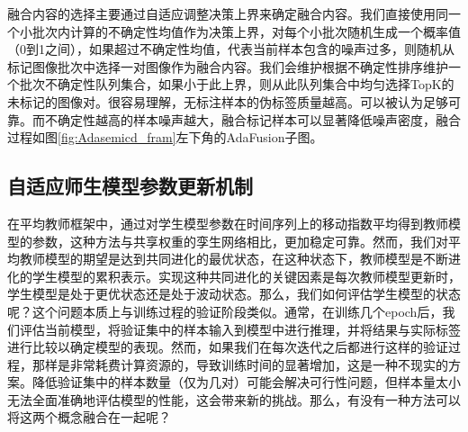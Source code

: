 \documentclass[lang=chs, degree=master, blindreview=false, adobe=false]{yanputhesis}
\begin{document}
融合内容的选择主要通过自适应调整决策上界来确定融合内容。我们直接使用同一个小批次内计算的不确定性均值作为决策上界，对每个小批次随机生成一个概率值（0到1之间），如果超过不确定性均值，代表当前样本包含的噪声过多，则随机从标记图像批次中选择一对图像作为融合内容。我们会维护根据不确定性排序维护一个批次不确定性队列集合，如果小于此上界，则从此队列集合中均匀选择TopK的未标记的图像对。很容易理解，无标注样本的伪标签质量越高。可以被认为足够可靠。而不确定性越高的样本噪声越大，融合标记样本可以显著降低噪声密度，融合过程如图\ref{fig:Adasemicd_fram}左下角的AdaFusion子图。
\subsection{自适应师生模型参数更新机制}
在平均教师框架中，通过对学生模型参数在时间序列上的移动指数平均得到教师模型的参数，这种方法与共享权重的孪生网络相比，更加稳定可靠。然而，我们对平均教师模型的期望是达到共同进化的最优状态，在这种状态下，教师模型是不断进化的学生模型的累积表示。实现这种共同进化的关键因素是每次教师模型更新时，学生模型是处于更优状态还是处于波动状态。那么，我们如何评估学生模型的状态呢？这个问题本质上与训练过程的验证阶段类似。通常，在训练几个epoch后，我们评估当前模型，将验证集中的样本输入到模型中进行推理，并将结果与实际标签进行比较以确定模型的表现。然而，如果我们在每次迭代之后都进行这样的验证过程，那样是非常耗费计算资源的，导致训练时间的显著增加，这是一种不现实的方案。降低验证集中的样本数量（仅为几对）可能会解决可行性问题，但样本量太小无法全面准确地评估模型的性能，这会带来新的挑战。那么，有没有一种方法可以将这两个概念融合在一起呢？
\end{document}
